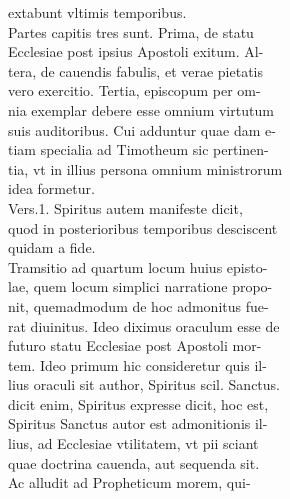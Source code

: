 \documentclass{article}
\begin{document}
\begin{pages}
                extabunt vltimis temporibus. \\
                Partes capitis tres sunt. Prima, de statu \\
                Ecclesiae post ipsius Apostoli exitum. Al- \\
                tera, de cauendis fabulis, et verae pietatis \\
                vero exercitio. Tertia, episcopum per om- \\
                nia exemplar debere esse omnium virtutum \\
                suis auditoribus. Cui adduntur quae dam e- \\
                tiam specialia ad Timotheum sic pertinen- \\
                tia, vt in illius persona omnium ministrorum \\
                idea formetur. \\
                Vers.1. Spiritus autem manifeste dicit, \\
                quod in posterioribus temporibus desciscent \\
                quidam a fide. \\
                Tramsitio ad quartum locum huius episto- \\
                lae, quem locum simplici narratione propo- \\
                nit, quemadmodum de hoc admonitus fue- \\
                rat diuinitus. Ideo diximus oraculum esse de \\
                futuro statu Ecclesiae post Apostoli mor- \\
                tem. Ideo primum hic consideretur quis il- \\
                lius oraculi sit author, Spiritus scil. Sanctus. \\
                dicit enim, Spiritus expresse dicit, hoc est, \\
                Spiritus Sanctus autor est admonitionis il- \\
                lius, ad Ecclesiae vtilitatem, vt pii sciant \\
                quae doctrina cauenda, aut sequenda sit. \\
                Ac alludit ad Propheticum morem, qui- \\

\end{pages}
\end{document}
